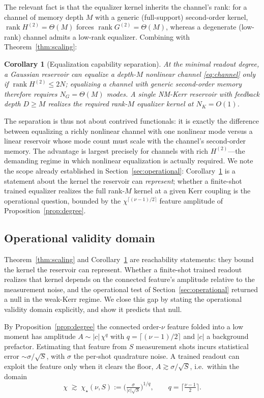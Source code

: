 \documentclass[11pt]{article}
\newtheorem{corollary}{Corollary}
\theoremstyle{remark}
\begin{document}
The relevant fact is that the equalizer kernel inherits the channel's rank: for a
channel of memory depth $M$ with a generic (full-support) second-order kernel,
$\operatorname{rank}H^{(2)}=\Theta(M)$ forces $\operatorname{rank}G^{(2)}=\Theta(M)$,
whereas a degenerate (low-rank) channel admits a low-rank equalizer. Combining
with Theorem~\ref{thm:scaling}:

\begin{corollary}[Equalization capability separation]
\label{cor:equalize}
At the minimal readout degree, a Gaussian reservoir can equalize a depth-$M$
nonlinear channel \eqref{eq:channel} only if $\operatorname{rank}H^{(2)}\le 2N$;
equalizing a channel with generic second-order memory therefore requires
$N_G=\Theta(M)$ modes. A single NM-Kerr reservoir with feedback depth $D\ge M$
realizes the required rank-$M$ equalizer kernel at $N_K=O(1)$.
\end{corollary}

The separation is thus not about contrived functionals: it is exactly the
difference between equalizing a richly nonlinear channel with one nonlinear mode
versus a linear reservoir whose mode count must scale with the channel's
second-order memory. The advantage is largest precisely for channels with rich
$H^{(2)}$---the demanding regime in which nonlinear equalization is actually
required. We note the scope already established in Section~\ref{sec:operational}:
Corollary~\ref{cor:equalize} is a statement about the kernel the reservoir can
\emph{represent}; whether a finite-shot trained equalizer realizes the full
rank-$M$ kernel at a given Kerr coupling is the operational question, bounded by
the $\chi^{\lceil(\nu-1)/2\rceil}$ feature amplitude of
Proposition~\ref{prop:degree}.

\subsection{Operational validity domain}
\label{sec:domain}

Theorem~\ref{thm:scaling} and Corollary~\ref{cor:equalize} are reachability
statements: they bound the kernel the reservoir can represent. Whether a
finite-shot trained readout realizes that kernel depends on the connected
feature's amplitude relative to the measurement noise, and the operational test
of Section~\ref{sec:operational} returned a null in the weak-Kerr regime. We close
this gap by stating the operational validity domain explicitly, and show it
predicts that null.

By Proposition~\ref{prop:degree} the connected order-$\nu$ feature folded into a
low moment has amplitude $A\sim|c|\,\chi^{q}$ with $q=\lceil(\nu-1)/2\rceil$ and
$|c|$ a background prefactor. Estimating that feature from $S$ measurement shots
incurs statistical error $\sim\sigma/\sqrt S$, with $\sigma$ the per-shot
quadrature noise. A trained readout can exploit the feature only when it clears
the floor, $A\gtrsim\sigma/\sqrt S$, i.e.\ within the domain
\begin{equation}
\chi \;\gtrsim\; \chi_\star(\nu,S):=
\Big(\tfrac{\sigma}{|c|\sqrt S}\Big)^{1/q},
\qquad q=\big\lceil\tfrac{\nu-1}{2}\big\rceil .
\label{eq:domain}
\end{equation}
\end{document}
